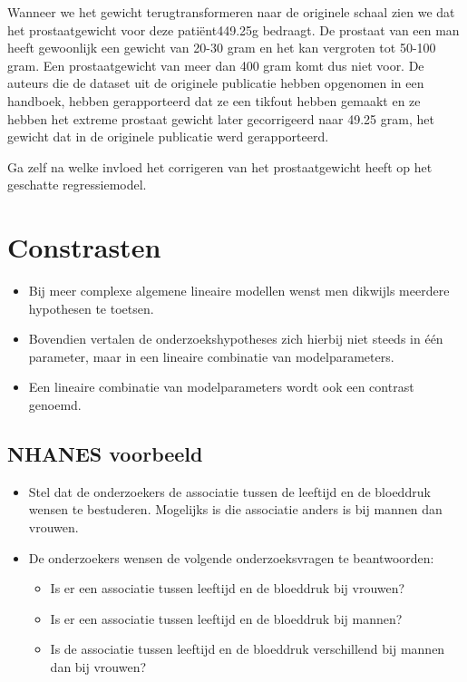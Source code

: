 \documentclass[
  12pt,dutch,coursenotes]{book}
\providecommand{\tightlist}{%
  \setlength{\itemsep}{0pt}\setlength{\parskip}{0pt}}
\theoremstyle{definition}
\theoremstyle{definition}
\theoremstyle{definition}
\theoremstyle{definition}
\theoremstyle{remark}
\begin{document}
Wanneer we het gewicht terugtransformeren naar de originele schaal zien we dat het prostaatgewicht voor deze patiënt449.25g bedraagt. De prostaat van een man heeft gewoonlijk een gewicht van 20-30 gram en het kan vergroten tot 50-100 gram.
Een prostaatgewicht van meer dan 400 gram komt dus niet voor.
De auteurs die de dataset uit de originele publicatie hebben opgenomen in een handboek, hebben gerapporteerd dat ze een tikfout hebben gemaakt en ze hebben het extreme prostaat gewicht later gecorrigeerd naar 49.25 gram, het gewicht dat in de originele publicatie werd gerapporteerd.

Ga zelf na welke invloed het corrigeren van het prostaatgewicht heeft op het geschatte regressiemodel.

\hypertarget{constrasten}{%
\section{Constrasten}\label{constrasten}}

\begin{itemize}
\tightlist
\item
  Bij meer complexe algemene lineaire modellen wenst men dikwijls meerdere hypothesen te toetsen.
\item
  Bovendien vertalen de onderzoekshypotheses zich hierbij niet steeds in één parameter, maar in een lineaire combinatie van modelparameters.
\item
  Een lineaire combinatie van modelparameters wordt ook een contrast genoemd.
\end{itemize}

\hypertarget{nhanes-voorbeeld-1}{%
\subsection{NHANES voorbeeld}\label{nhanes-voorbeeld-1}}

\begin{itemize}
\item
  Stel dat de onderzoekers de associatie tussen de leeftijd en de bloeddruk wensen te bestuderen. Mogelijks is die associatie anders is bij mannen dan vrouwen.
\item
  De onderzoekers wensen de volgende onderzoeksvragen te beantwoorden:

  \begin{itemize}
  \tightlist
  \item
    Is er een associatie tussen leeftijd en de bloeddruk bij vrouwen?
  \item
    Is er een associatie tussen leeftijd en de bloeddruk bij mannen?
  \item
    Is de associatie tussen leeftijd en de bloeddruk verschillend bij mannen dan bij vrouwen?
  \end{itemize}
\end{itemize}
\end{document}
